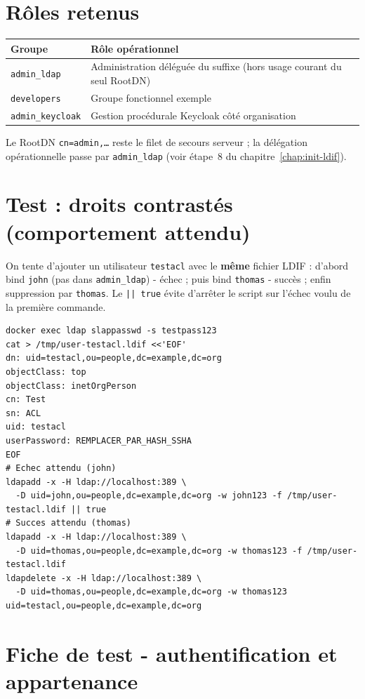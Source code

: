 \documentclass[11pt,a4paper]{report}
\begin{document}
\section{Rôles retenus}

\begin{tabular}{@{}ll@{}}
\toprule
\textbf{Groupe} & \textbf{Rôle opérationnel} \\
\midrule
\texttt{admin\_ldap} & Administration déléguée du suffixe (hors usage courant du seul RootDN) \\
\texttt{developers} & Groupe fonctionnel exemple \\
\texttt{admin\_keycloak} & Gestion procédurale Keycloak côté organisation \\
\bottomrule
\end{tabular}

Le RootDN \texttt{cn=admin,\dots} reste le filet de secours serveur ; la délégation opérationnelle passe par \texttt{admin\_ldap} (voir étape~8 du chapitre~\ref{chap:init-ldif}).

\section{Test : droits contrastés (comportement attendu)}

On tente d'ajouter un utilisateur \texttt{testacl} avec le \textbf{même} fichier LDIF : d'abord bind \texttt{john} (pas dans \texttt{admin\_ldap}) - échec ; puis bind \texttt{thomas} - succès ; enfin suppression par \texttt{thomas}. Le \texttt{|| true} évite d'arrêter le script sur l'échec voulu de la première commande.

\begin{lstlisting}[style=bashstyle]
docker exec ldap slappasswd -s testpass123
cat > /tmp/user-testacl.ldif <<'EOF'
dn: uid=testacl,ou=people,dc=example,dc=org
objectClass: top
objectClass: inetOrgPerson
cn: Test
sn: ACL
uid: testacl
userPassword: REMPLACER_PAR_HASH_SSHA
EOF
# Echec attendu (john)
ldapadd -x -H ldap://localhost:389 \
  -D uid=john,ou=people,dc=example,dc=org -w john123 -f /tmp/user-testacl.ldif || true
# Succes attendu (thomas)
ldapadd -x -H ldap://localhost:389 \
  -D uid=thomas,ou=people,dc=example,dc=org -w thomas123 -f /tmp/user-testacl.ldif
ldapdelete -x -H ldap://localhost:389 \
  -D uid=thomas,ou=people,dc=example,dc=org -w thomas123 uid=testacl,ou=people,dc=example,dc=org
\end{lstlisting}

\section{Fiche de test - authentification et appartenance}
\end{document}
